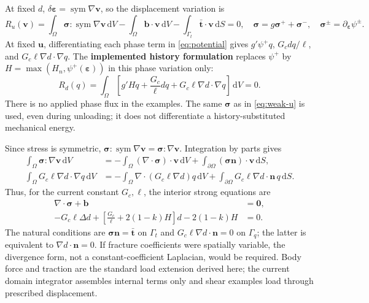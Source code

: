 \documentclass[11pt,a4paper]{article}
\newcommand{\eps}{\bm{\varepsilon}}
\newcommand{\sig}{\bm{\sigma}}
\newcommand{\uu}{\bm{u}}
\newcommand{\vv}{\bm{v}}
\newcommand{\sym}{\operatorname{sym}}
\newcommand{\dd}{\,\mathrm{d}}
\numberwithin{equation}{section}
\begin{document}
At fixed $d$, $\delta\eps=\sym\nabla\vv$, so the displacement variation is
\begin{equation}
 R_u(\vv)=\int_\Omega\sig:\sym\nabla\vv\dd V
 -\int_\Omega\bm b\cdot\vv\dd V
 -\int_{\Gamma_t}\bar{\bm t}\cdot\vv\dd S=0,
 \quad\sig=g\sig^++\sig^-,\quad\sig^\pm=\partial_{\eps}\psi^\pm.
 \label{eq:weak-u}
\end{equation}
At fixed $\uu$, differentiating each phase term in \eqref{eq:potential} gives
$g'\psi^+q$, $G_c d q/\ell$, and $G_c\ell\nabla d\cdot\nabla q$.
The \textbf{implemented history formulation} replaces $\psi^+$ by
$H=\max(H_n,\psi^+(\eps))$ in this phase variation only:
\begin{equation}
 R_d(q)=\int_\Omega\left[g'Hq+\frac{G_c}{\ell}d q
                   +G_c\ell\nabla d\cdot\nabla q\right]\dd V=0.
 \label{eq:weak-d}
\end{equation}
There is no applied phase flux in the examples. The same $\sig$ as in
\eqref{eq:weak-u} is used, even during unloading; it does not differentiate a
history-substituted mechanical energy.

Since stress is symmetric, $\sig:\sym\nabla\vv=\sig:\nabla\vv$.
Integration by parts gives
\begin{align}
 \int_\Omega\sig:\nabla\vv\dd V
 &=-\int_\Omega(\nabla\cdot\sig)\cdot\vv\dd V
      +\int_{\partial\Omega}(\sig\bm n)\cdot\vv\dd S,\\
 \int_\Omega G_c\ell\nabla d\cdot\nabla q\dd V
 &=-\int_\Omega\nabla\cdot(G_c\ell\nabla d)q\dd V
      +\int_{\partial\Omega}G_c\ell\nabla d\cdot\bm n\,q\dd S.
\end{align}
Thus, for the current constant $G_c,\ell$, the interior strong equations are
\begin{equation}\boxed{\begin{aligned}
 \nabla\cdot\sig+\bm b&=\bm0,\\
 -G_c\ell\Delta d+\left[\frac{G_c}{\ell}+2(1-k)H\right]d
                -2(1-k)H&=0.
\end{aligned}}\label{eq:strong}\end{equation}
The natural conditions are $\sig\bm n=\bar{\bm t}$ on $\Gamma_t$ and
$G_c\ell\nabla d\cdot\bm n=0$ on $\Gamma_q$; the latter is equivalent to
$\nabla d\cdot\bm n=0$. If fracture coefficients were spatially variable, the
divergence form, not a constant-coefficient Laplacian, would be required.
Body force and traction are the standard load extension derived here; the
current domain integrator assembles internal terms only and shear examples
load through prescribed displacement.
\end{document}
